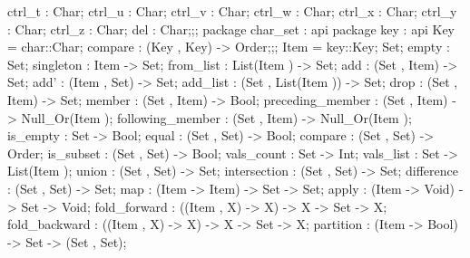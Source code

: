 {{{{                                        ctrl_t : Char;
                                        ctrl_u : Char;
                                        ctrl_v : Char;
                                        ctrl_w : Char;
                                        ctrl_x : Char;
                                        ctrl_y : Char;
                                        ctrl_z : Char;
                                        del : Char;};;
                                package char_set
                                  : api {   package key
                                              : api {
                                                    Key  = char::Char;
                                                    compare : (Key , Key) -> Order;};;
                                        Item  = key::Key;
                                        Set;
                                        empty : Set;
                                        singleton : Item -> Set;
                                        from_list : List(Item ) -> Set;
                                        add : (Set , Item) -> Set;
                                        add' : (Item , Set) -> Set;
                                        add_list : (Set , List(Item )) -> Set;
                                        drop : (Set , Item) -> Set;
                                        member : (Set , Item) -> Bool;
                                        preceding_member : (Set , Item) -> Null_Or(Item );
                                        following_member : (Set , Item) -> Null_Or(Item );
                                        is_empty : Set -> Bool;
                                        equal : (Set , Set) -> Bool;
                                        compare : (Set , Set) -> Order;
                                        is_subset : (Set , Set) -> Bool;
                                        vals_count : Set -> Int;
                                        vals_list : Set -> List(Item );
                                        union : (Set , Set) -> Set;
                                        intersection : (Set , Set) -> Set;
                                        difference : (Set , Set) -> Set;
                                        map : (Item -> Item) -> Set -> Set;
                                        apply : (Item -> Void) -> Set -> Void;
                                        fold_forward : ((Item , X) -> X) -> X -> Set -> X;
                                        fold_backward : ((Item , X) -> X) -> X -> Set -> X;
                                        partition : (Item -> Bool) -> Set -> (Set , Set);
}}}}
